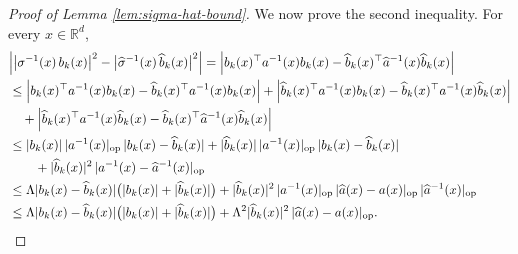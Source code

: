 \documentclass{article}
\theoremstyle{plain}
\theoremstyle{definition}
\theoremstyle{remark}
\newcommand{\RD}{\mathbb{R}^{d}}
\begin{document}
\begin{proof}[Proof of Lemma \ref{lem:sigma-hat-bound}]
We now prove the second inequality. For every \(x\in\RD\),
\begin{align}
&\Big|\big\lvert \sigma^{-1} (x)\,b_k(x) \big\rvert^2-\big\lvert \widehat{\sigma}^{-1} (x)\,\widehat{b}_k(x) \big\rvert^2\Big|= \left| b_k(x)^{\top}a^{-1}(x)b_k(x)-\widehat b_k(x)^{\top}\widehat a^{-1}(x)\widehat b_k(x)\right|\nonumber\\
&\leq \left| b_k(x)^{\top}a^{-1}(x)b_k(x)-\widehat b_k(x)^{\top} a^{-1}(x)b_k(x)\right| +\left| \widehat b_k(x)^{\top} a^{-1}(x)b_k(x)-\widehat b_k(x)^{\top} a^{-1}(x)\widehat b_k(x)\right|\nonumber\\
&\quad +\left| \widehat b_k(x)^{\top} a^{-1}(x)\widehat b_k(x)-\widehat b_k(x)^{\top}\widehat a^{-1}(x)\widehat b_k(x)\right|\nonumber\\
&\leq |b_k(x)|\,| a^{-1}(x)|_{\mathrm{op}}\,|b_k(x)-\widehat b_k(x)| +|\widehat b_k(x)|\,| a^{-1}(x)|_{\mathrm{op}}\,|b_k(x)-\widehat b_k(x)|\nonumber\\
&\qquad +|\widehat{b}_k(x)|^2\,|a^{-1}(x)-\widehat a^{-1}(x)|_{\mathrm{op}} \nonumber\\
&\leq \Lambda |b_k(x)-\widehat b_k(x)|\bigl(|b_k(x)|+|\widehat b_k(x)|\bigr)+|\widehat{b}_k(x)|^2\,|a^{-1}(x)|_{\mathrm{op}}\,|\widehat a(x)-a(x)|_{\mathrm{op}}\,|\widehat a^{-1}(x)|_{\mathrm{op}}\nonumber\\
&\leq \Lambda |b_k(x)-\widehat b_k(x)|\bigl(|b_k(x)|+|\widehat b_k(x)|\bigr)+\Lambda^2 |\widehat{b}_k(x)|^2\,|\widehat a(x)-a(x)|_{\mathrm{op}}.\nonumber\hfill \qedhere
\end{align}
\end{proof}
\end{document}
